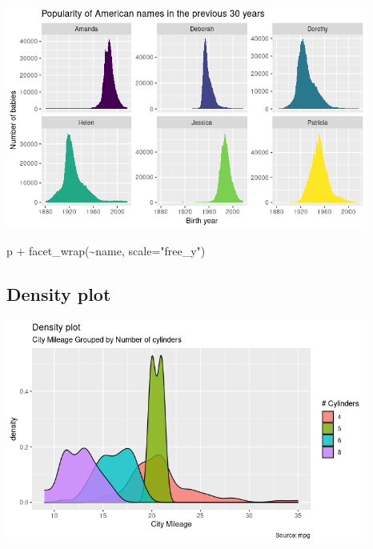 \documentclass[
]{book}
\newenvironment{Shaded}{\begin{snugshade}}{\end{snugshade}}
\newcommand{\AttributeTok}[1]{\textcolor[rgb]{0.77,0.63,0.00}{#1}}
\newcommand{\FunctionTok}[1]{\textcolor[rgb]{0.00,0.00,0.00}{#1}}
\newcommand{\NormalTok}[1]{#1}
\newcommand{\SpecialCharTok}[1]{\textcolor[rgb]{0.00,0.00,0.00}{#1}}
\newcommand{\StringTok}[1]{\textcolor[rgb]{0.31,0.60,0.02}{#1}}
\begin{document}
\includegraphics[width=4.6875in,height=\textheight]{images/10/000006.png}

\begin{Shaded}
\begin{Highlighting}[]
\NormalTok{p }\SpecialCharTok{+} \FunctionTok{facet\_wrap}\NormalTok{(}\SpecialCharTok{\textasciitilde{}}\NormalTok{name, }\AttributeTok{scale=}\StringTok{"free\_y"}\NormalTok{)}
\end{Highlighting}
\end{Shaded}

\hypertarget{density-plot}{%
\subsection{Density plot}\label{density-plot}}

\includegraphics[width=4.6875in,height=\textheight]{images/10/000003.png}
\end{document}

